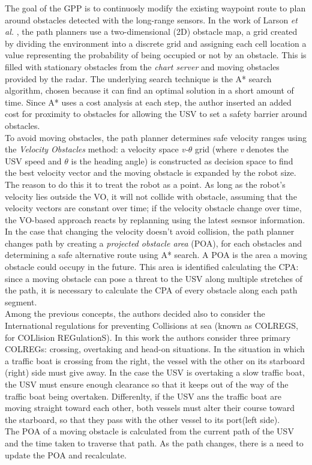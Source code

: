 \documentclass[12pt]{article}
\begin{document}
              The goal of the GPP is to continuosly modify the existing waypoint route to plan around obstacles detected with the long-range sensors. In the work of Larson \textit{et al.} \parencite{Larson2007,Larson2007a}, the path planners use a two-dimensional (2D) obstacle map, a grid created by dividing the environment into a discrete grid and assigning each cell location a value representing the probability of being occupied or not by an obstacle. This is filled with stationary obstacles from the \textit{chart server} and moving obstacles provided by the radar. The underlying search technique is the A* search algorithm, chosen because it can find an optimal solution in a short amount of time. Since A* uses a cost analysis at each step, the author inserted an added cost for proximity to obstacles for allowing the USV to set a safety barrier around obstacles.\\
              To avoid moving obstacles, the path planner determines safe velocity ranges using the \textit{Velocity Obstacles} method: a velocity space \textit{v-$\theta$} grid (where \textit{v} denotes the USV speed and \textit{$\theta$} is the heading angle) is constructed as decision space to find the best velocity vector and the moving obstacle is expanded by the robot size. The reason to do this it to treat the robot as a point. As long as the robot's velocity lies outside the VO, it will not collide with obstacle, assuming that the velocity vectors are constant over time; if the velocity obstacle change over time, the VO-based approach reacts by replanning using the latest sesnsor information.\\
              In the case that changing the velocity doesn't avoid collision, the path planner changes path by creating a \textit{projected obstacle area} (POA), for each obstacles and determining a safe alternative route using A* search. A POA is the area a moving obstacle could occupy in the future. This area is identified calculating the CPA: since a moving obstacle can pose a threat to the USV along multiple stretches of the path, it is necessary to calculate the CPA of every obstacle along each path segment.\\
              Among the previous concepts, the authors decided also to consider the International regulations for preventing Collisions at sea (known as COLREGS, for COLlision REGulationS). In this work the authors consider three primary COLREGs: crossing, overtaking and head-on situations. In the situation in which a traffic boat is crossing from the right, the vessel with the other on its starboard (right) side must give away. In the case the USV is overtaking a slow traffic boat, the USV must ensure enough clearance so that it keeps out of the way of the traffic boat being overtaken. Differenlty, if the USV ans the traffic boat are moving straight toward each other, both vessels must alter their course toward the starboard, so that they pass with the other vessel to its port(left side).\\
              The POA of a moving obstacle is calculated from the current path of the USV and the time taken to traverse that path. As the path changes, there is a need to update the POA and recalculate.
\end{document}
